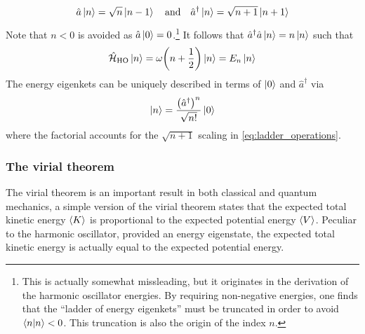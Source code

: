 \documentclass[nofootinbib,reprint,english]{revtex4-1}
\newcommand{\hatHH}{\hat{\mathcal{H}}}
\begin{document}
\begin{equation}\label{eq:ladder_operations}
\hat{a}\ket{n}=\sqrt{n}\ket{n-1}\qand\hat{a}^\dagger\ket{n}=\sqrt{n+1}\ket{n+1}
\end{equation}
Note that \(n<0\) is avoided as \(\hat{a}\ket{0}=0\).\footnote{This is actually somewhat missleading, but it originates in the derivation of the harmonic oscillator energies. By requiring non-negative energies, one finds that the ``ladder of energy eigenkets'' must be truncated in order to avoid \(\braket{n}<0\). This truncation is also the origin of the index \(n\).} It follows that \(\hat{a}^\dagger\hat{a}\ket{n}=n\ket{n}\) such that
\begin{equation}\label{eq:harmonic_oscillator_energies}
\hatHH_\text{HO}\ket{n}=\omega\bigg(n+\frac{1}{2}\bigg)\ket{n}=E_n\ket{n}
\end{equation}
The energy eigenkets can be uniquely described in terms of \(\ket{0}\) and \(\hat{a}^\dagger\) via
\begin{equation}\label{eq:harmonic_oscillator_eigenkets}
\ket{n}=\frac{\big(\hat{a}^\dagger\big)^n}{\sqrt{n!}}\ket{0}
\end{equation}
where the factorial accounts for the \(\sqrt{n+1}\) scaling in \eqref{eq:ladder_operations}.

\subsubsection{The virial theorem}
The virial theorem is an important result in both classical and quantum mechanics, a simple version of the virial theorem states that the expected total kinetic energy \(\expval{K}\) is proportional to the expected potential energy \(\expval{V}\). Peculiar to the harmonic oscillator, provided an energy eigenstate, the expected total kinetic energy is actually equal to the expected potential energy.
\end{document}
